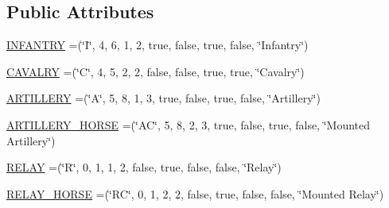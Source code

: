 \subsection*{Public Attributes}
\begin{DoxyCompactItemize}
\item 
\mbox{\hyperlink{enumrule_engine_1_1entity_1_1_e_unit_property_ae58d0272630cbf4cb54d58097004cfbb}{I\+N\+F\+A\+N\+T\+RY}} =(\char`\"{}I\char`\"{}, 4, 6, 1, 2, true, false, true, false, \char`\"{}Infantry\char`\"{})
\item 
\mbox{\hyperlink{enumrule_engine_1_1entity_1_1_e_unit_property_a975c0d18c88df074ef3bd5fecf10b67b}{C\+A\+V\+A\+L\+RY}} =(\char`\"{}C\char`\"{}, 4, 5, 2, 2, false, false, true, true, \char`\"{}Cavalry\char`\"{})
\item 
\mbox{\hyperlink{enumrule_engine_1_1entity_1_1_e_unit_property_a0034075489168dff9ec63f03f6c48746}{A\+R\+T\+I\+L\+L\+E\+RY}} =(\char`\"{}A\char`\"{}, 5, 8, 1, 3, true, false, true, false, \char`\"{}Artillery\char`\"{})
\item 
\mbox{\hyperlink{enumrule_engine_1_1entity_1_1_e_unit_property_a1e88e4de22bc7390620595fc2bf4b5bb}{A\+R\+T\+I\+L\+L\+E\+R\+Y\+\_\+\+H\+O\+R\+SE}} =(\char`\"{}AC\char`\"{}, 5, 8, 2, 3, true, false, true, false, \char`\"{}Mounted Artillery\char`\"{})
\item 
\mbox{\hyperlink{enumrule_engine_1_1entity_1_1_e_unit_property_a9f9388e8e112dea694e941cd7ec38bba}{R\+E\+L\+AY}} =(\char`\"{}R\char`\"{}, 0, 1, 1, 2, false, true, false, false, \char`\"{}Relay\char`\"{})
\item 
\mbox{\hyperlink{enumrule_engine_1_1entity_1_1_e_unit_property_a6ac90d99fd27e7e22aa798d3291a39f5}{R\+E\+L\+A\+Y\+\_\+\+H\+O\+R\+SE}} =(\char`\"{}RC\char`\"{}, 0, 1, 2, 2, false, true, false, false, \char`\"{}Mounted Relay\char`\"{})
\end{DoxyCompactItemize}
